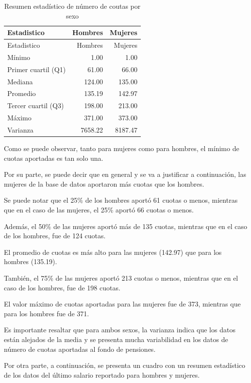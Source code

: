\documentclass[
]{article}
\begin{document}
\begin{longtable}[]{@{}lrr@{}}
\caption{Resumen estadístico de número de coutas por
sexo}\tabularnewline
\toprule\noalign{}
Estadistico & Hombres & Mujeres \\
\midrule\noalign{}
\endfirsthead
\toprule\noalign{}
Estadistico & Hombres & Mujeres \\
\midrule\noalign{}
\endhead
\bottomrule\noalign{}
\endlastfoot
Mínimo & 1.00 & 1.00 \\
Primer cuartil (Q1) & 61.00 & 66.00 \\
Mediana & 124.00 & 135.00 \\
Promedio & 135.19 & 142.97 \\
Tercer cuartil (Q3) & 198.00 & 213.00 \\
Máximo & 371.00 & 373.00 \\
Varianza & 7658.22 & 8187.47 \\
\end{longtable}

Como se puede observar, tanto para mujeres como para hombres, el mínimo
de cuotas aportadas es tan solo una.

Por su parte, se puede decir que en general y se va a justificar a
continuación, las mujeres de la base de datos aportaron más cuotas que
los hombres.

Se puede notar que el 25\% de los hombres aportó 61 cuotas o menos,
mientras que en el caso de las mujeres, el 25\% aportó 66 cuotas o
menos.

Además, el 50\% de las mujeres aportó más de 135 cuotas, mientras que en
el caso de los hombres, fue de 124 cuotas.

El promedio de cuotas es más alto para las mujeres (142.97) que para los
hombres (135.19).

También, el 75\% de las mujeres aportó 213 cuotas o menos, mientras que
en el caso de los hombres, fue de 198 cuotas.

El valor máximo de cuotas aportadas para las mujeres fue de 373,
mientras que para los hombres fue de 371.

Es importante resaltar que para ambos sexos, la varianza indica que los
datos están alejados de la media y se presenta mucha variabilidad en los
datos de número de cuotas aportadas al fondo de pensiones.

\newpage

Por otra parte, a continuación, se presenta un cuadro con un resumen
estadístico de los datos del último salario reportado para hombres y
mujeres.
\end{document}
